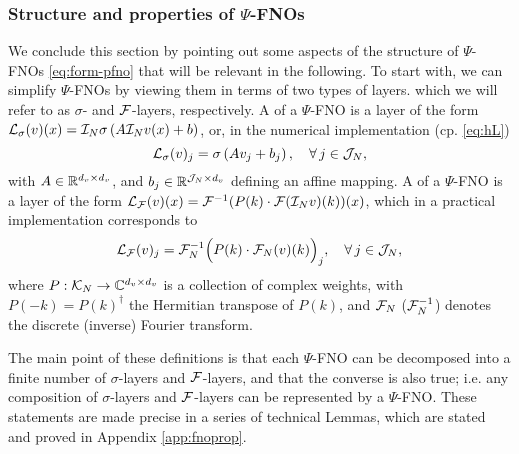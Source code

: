 \documentclass[reqno,a4paper]{amsart}
\begin{document}
\subsubsection{Structure and properties of $\Psi$-FNOs}
\label{sec:fnoprop}
We conclude this section by pointing out some aspects of the structure of $\Psi$-FNOs \eqref{eq:form-pfno} that will be relevant in the following. To start with, we can simplify $\Psi$-FNOs by viewing them in terms of two types of layers. which we will refer to as $\sigma$- and $\mathcal{F}$-layers, respectively. A  of a $\Psi$-FNO is a  layer of the form $\mathcal{L}_\sigma(v)(x)=\mathcal{I}_N\sigma\left(A \mathcal{I}_N v(x) + b\right)$, or, in the numerical implementation (cp. \eqref{eq:hL})
\[
\mathcal{L}_\sigma(v)_j = \sigma\left(A v_j + b_j\right)
,
\quad
\forall\, j\in \mathcal{J}_N,
\]
with $A \in \mathbb{R}^{d_v\times d_v}$, and $b_j\in \mathbb{R}^{\mathcal{J}_N \times d_v}$ defining an affine mapping. A  of a $\Psi$-FNO is a  layer of the form $\mathcal{L}_{\mathcal{F}}(v)(x)=\mathcal{F}^{-1}(P(k)\cdot \mathcal{F}(\mathcal{I}_N v)(k))(x)$, which in a practical implementation corresponds to
\[
\mathcal{L}_{\mathcal{F}}(v)_j
=
\mathcal{F}^{-1}_N\Big(P(k)\cdot \mathcal{F}_N(v)(k)\Big)_j
,
\quad
\forall \, j\in \mathcal{J}_N,
\]
where $P: \mathcal{K}_N \to \mathbb{C}^{d_v\times d_v}$ is a collection of complex weights, with $P(-k) = P(k)^\dagger$ the Hermitian transpose of $P(k)$, and $\mathcal{F}_N$ ($\mathcal{F}_N^{-1}$) denotes the discrete (inverse) Fourier transform.

The main point of these definitions is that each $\Psi$-FNO can be decomposed into a finite number of $\sigma$-layers and $\mathcal{F}$-layers, and that the converse is also true; i.e. any composition of $\sigma$-layers and $\mathcal{F}$-layers can be represented by a $\Psi$-FNO. These statements are made precise in a series of technical Lemmas, which are stated and proved in Appendix \ref{app:fnoprop}.
\end{document}
